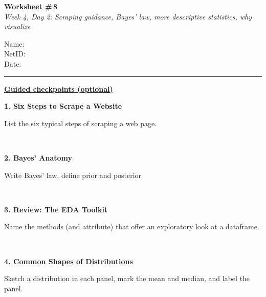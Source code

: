 \documentclass[11pt]{article}
\newcommand{\blankspace}[1]{%
  \vspace{0.3em}
  \begin{minipage}[t][#1][t]{\linewidth}
  \end{minipage}
  \vspace{0.3em}
}
\newcommand{\guidedopen}[4]{%
  \noindent\textbf{#1}\\[0.18em]
  \noindent
  \begin{minipage}[t]{0.485\textwidth}
    #2
    \blankspace{#3}
  \end{minipage}
  \hfill
  \begin{minipage}[t]{0.485\textwidth}
    \blankspace{#4}
  \end{minipage}
  \\[0.4em]
}
\newcommand{\panelbox}[3]{%
  \begin{minipage}[t]{\dimexpr#1+2\fboxsep+2\fboxrule\relax}
    \framebox[#1][c]{\rule{0pt}{#2}}%
    \if\relax\detokenize{#3}\relax\else
      \\[0.25em]{\centering\small #3\par}%
    \fi
  \end{minipage}%
}
\begin{document}
\RaggedRight

\noindent
\begin{minipage}[t]{0.55\textwidth}
  \vspace{0pt}
  {\LARGE \textbf{Worksheet \#\,8}} \\[0.18em]
  {\large \textit{Week 4, Day 2: Scraping guidance, Bayes' law, more descriptive statistics, why visualize}}
\end{minipage}
\hfill
\begin{minipage}[t]{0.40\textwidth}
  \vspace{0pt}
  \small
  Name: \underline{\hspace{4.5cm}} \\[0.35em]
  NetID: \underline{\hspace{4.3cm}} \\[0.35em]
  Date: \underline{\hspace{4.4cm}} \\
\end{minipage}

\vspace{0.6em}
\noindent\rule{\linewidth}{0.6pt}
\vspace{0.1em}

\noindent\underline{\textbf{Guided checkpoints (optional)}}
\vspace{0.8em}

\guidedopen{1. Six Steps to Scrape a Website}{
List the six typical steps of scraping a web page.
}{5.0cm}{5.25cm}

\vfill

\guidedopen{2. Bayes' Anatomy}{
Write Bayes' law, define prior and posterior
}{4.6cm}{5.3cm}

\vfill

\guidedopen{3. Review: The EDA Toolkit}{
Name the methods (and attribute) that offer an exploratory look at a dataframe.
}{4.35cm}{5.55cm}

\vfill

\newpage

\guidedopen{4. Common Shapes of Distributions}{
Sketch a distribution in each panel, mark the mean and median, and label the panel.

\vspace{0.5em}

\noindent
\panelbox{2.5cm}{2.5cm}{}\hfill
\panelbox{2.5cm}{2.5cm}{}\hfill
\panelbox{2.5cm}{2.5cm}{}
}{0.2cm}{5.05cm}
\end{document}

